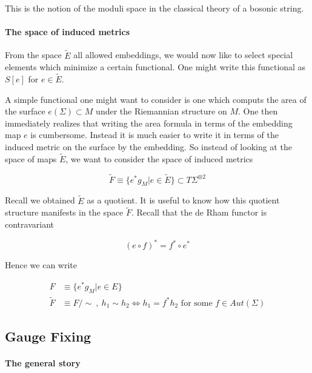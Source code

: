 \documentclass{article}
\begin{document}
            This is the notion of the moduli space in the classical theory of a bosonic string.

        \paragraph{The space of induced metrics} 

            From the space $\tilde E$ all allowed embeddings, we would now like to select special elements which minimize a certain functional. One might write this functional as $S[e]$ for $e \in \tilde E$.

            A simple functional one might want to consider is one which computs the area of the surface $e(\Sigma) \subset M$ under the Riemannian structure on $M$. One then immediately realizes that writing the area formula in terms of the embedding map $e$ is cumbersome. Instead it is much easier to write it in terms of the induced metric on the surface by the embedding. So instead of looking at the space of maps $\tilde E$, we want to consider the space of induced metrics

            \begin{equation}
                \tilde F \equiv \{e^* g_M | e \in \tilde E \} \subset T\Sigma^{\otimes 2}
            \end{equation}

            Recall we obtained $\tilde E$ as a quotient. It is useful to know how this quotient structure manifests in the space $\tilde F$. Recall that the de Rham functor is contravariant

            \begin{equation}
                (e \circ f)^* = f^* \circ e^*
            \end{equation}

            Hence we can write

            \begin{align}
                F &\equiv \{ e^*g_M | e \in E \}\\
                \tilde F &\equiv F / \sim ~,~ h_1 \sim h_2 \iff h_1 = f^* h_2 \text{ for some } f \in Aut(\Sigma)
            \end{align}

        \subsection{Gauge Fixing}
            \paragraph{The general story}
\end{document}

